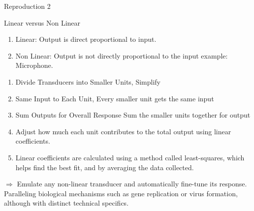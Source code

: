 \documentclass[xetex,notheorems,hyperref={pdfpagelabels=true},xcolor=table]{beamer}
\theoremstyle{plain}
\theoremstyle{definition}
\theoremstyle{example}
\theoremstyle{example}
\begin{document}
\begin{frame}{Reproduction 2}
    \begin{block}{Linear versus Non Linear}
        \begin{enumerate}[\indent $\square$]
            \item Linear: Output is direct proportional to input.
            \item Non Linear: Output is not directly proportional to the input example: Microphone. 
        \end{enumerate}
    \end{block}
\begin{enumerate}
    \item Divide Transducers into Smaller Units, Simplify
    \item Same Input to Each Unit, Every smaller unit gets the same input
    \item Sum Outputs for Overall Response Sum the smaller units together for output
    \item Adjust how much each unit contributes to the total output using linear coefficients. 
    \item Linear coefficients are calculated using a method called least-squares, which helps find the best fit, and by averaging the data collected.
\end{enumerate}
$\Rightarrow$ Emulate any non-linear transducer and automatically fine-tune its response. Paralleling biological mechanisms such as gene replication or virus formation, although with distinct technical specifics.
\end{frame}
\end{document}
